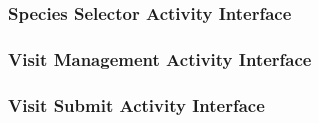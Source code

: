 	\newpage
	\subsubsection{Species Selector Activity Interface}
		

	\newpage
	\subsubsection{Visit Management Activity Interface}
		

	\newpage
	\subsubsection{Visit Submit Activity Interface}
		